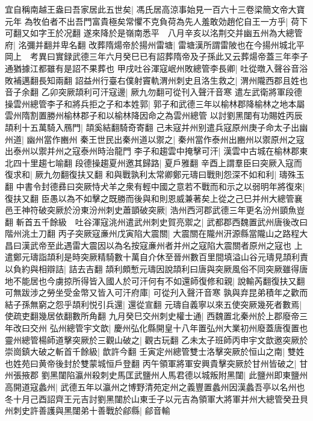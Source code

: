 宜自稱南越王盎曰吾家居此五世矣|{
	馮氏居高涼事始見一百六十三卷梁簡文帝大寶元年}
為牧伯者不出吾門富貴極矣常懼不克負荷為先人羞敢効趙佗自王一方乎|{
	荷下可翻又如字王於况翻}
遂來降於是嶺南悉平　八月辛亥以洺荆交并幽五州為大總管府|{
	洺彌并翻并卑名翻}
改葬隋煬帝於揚州雷塘|{
	雷塘漢所謂雷陂也在今揚州城北平岡上　考異曰實録武德三年六月癸巳已有詔葬隋帝及子孫此又云葬煬帝蓋三年李子通猶據江都雖有是詔不果葬也}
甲戌吐谷渾寇岷州敗總管李長卿|{
	吐從暾入聲谷音浴敗補邁翻長知兩翻}
詔益州行臺右僕射竇軌渭州刺史且洛生救之|{
	渭州隴西郡且姓也音子余翻}
乙卯突厥頡利可汗寇邊|{
	厥九勿翻可從刊入聲汗音寒}
遣左武衛將軍段德操雲州總管李子和將兵拒之子和本姓郭|{
	郭子和武德三年以榆林郡降榆林之地本屬雲州隋割置勝州榆林郡子和以榆林降因命之為雲州總管}
以討劉黑闥有功賜姓丙辰頡利十五萬騎入鴈門|{
	頡奚結翻騎奇寄翻}
己未寇并州别遣兵寇原州庚子命太子出幽州道|{
	幽州當作豳州}
秦王世民出秦州道以禦之|{
	秦州當作泰州出豳州以禦原州之寇出泰州以禦并州之寇泰州時治龍門}
李子和趨雲中掩擊可汗|{
	漢雲中古城在榆林郡東北四十里趨七喻翻}
段德操趨夏州邀其歸路|{
	夏戶雅翻}
辛酉上謂羣臣曰突厥入寇而復求和|{
	厥九勿翻復扶又翻}
和與戰孰利太常卿鄭元璹曰戰則怨深不如和利|{
	璹殊玉翻}
中書令封德彞曰突厥恃犬羊之衆有輕中國之意若不戰而和示之以弱明年將復來|{
	復扶又翻}
臣愚以為不如擊之既勝而後與和則恩威兼著矣上從之己巳并州大總管襄邑王神符破突厥於汾東汾州刺史蕭顗破突厥|{
	浩州西河郡武德三年更名汾州顗魚豈翻}
斬首五千餘級　吐谷渾寇洮州遣武州刺史賀亮禦之|{
	武都郡西魏置武州唐後改曰階州洮土刀翻}
丙子突厥寇亷州戊寅陷大震關|{
	大震關在隴州汧源縣當隴山之路程大昌曰漢武帝至此遇雷大震因以為名按寇亷州者并州之寇陷大震關者原州之寇也}
上遣鄭元璹詣頡利是時突厥精騎數十萬自介休至晉州數百里間填溢山谷元璹見頡利責以負約與相辯詰|{
	詰去吉翻}
頡利頗慙元璹因說頡利曰唐與突厥風俗不同突厥雖得唐地不能居也今虜掠所得皆入國人於可汗何有不如還師復修和親|{
	說輸芮翻復扶又翻}
可無跋涉之勞坐受金幣又皆入可汗府庫|{
	可從刋入聲汗音寒}
孰與弃昆弟積年之歡而結子孫無窮之怨乎頡利悦引兵還|{
	還從宣翻}
元璹自義寧以來五使突厥幾死者數焉|{
	使疏吏翻幾居依翻數所角翻}
九月癸巳交州刺史權士通|{
	西魏置北秦州於上郡廢帝三年改曰交州}
弘州總管宇文歆|{
	慶州弘化縣開皇十八年置弘州大業初州廢蓋唐復置也}
靈州總管楊師道擊突厥於三觀山破之|{
	觀古玩翻}
乙未太子班師丙申宇文歆邀突厥於崇崗鎮大破之斬首千餘級|{
	歆許今翻}
壬寅定州總管雙士洛擊突厥於恒山之南|{
	雙姓也姓苑曰黄帝後封於雙蒙城恒戶登翻}
丙午領軍將軍安興貴擊突厥於甘州皆破之|{
	甘州張掖郡}
劉黑闥陷瀛州殺刺史馬匡武鹽州人馬君德以城叛附黑闥|{
	此鹽州即東鹽州}
高開道寇蠡州|{
	武德五年以瀛州之博野清苑定州之義豐置蠡州因漢蠡吾亭以名州也}
冬十月己酉詔齊王元吉討劉黑闥於山東壬子以元吉為領軍大將軍并州大總管癸丑貝州刺史許善護與黑闥弟十善戰於鄃縣|{
	鄃音輸}
